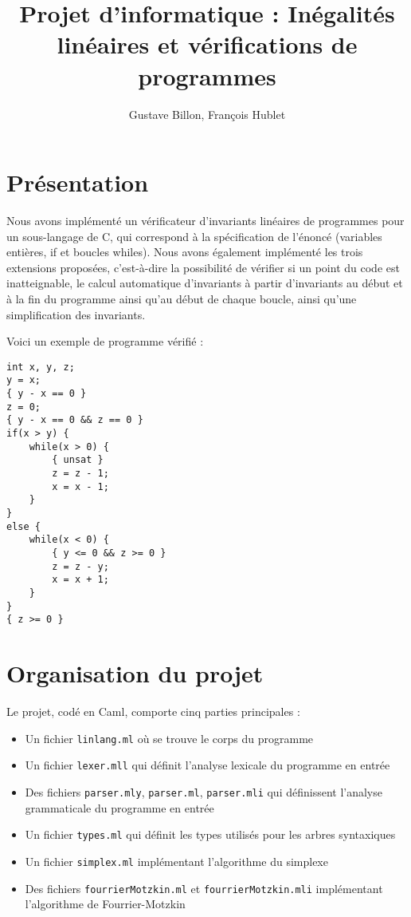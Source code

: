 \documentclass[a4paper]{article}
\title{Projet d'informatique : Inégalités linéaires et vérifications de programmes}
\author{Gustave Billon, François Hublet}
\begin{document}
\maketitle


\section{Présentation}

Nous avons implémenté un vérificateur d'invariants linéaires de programmes pour un sous-langage de C, qui correspond à la spécification de l'énoncé (variables entières, if et boucles whiles). Nous avons également implémenté les trois extensions proposées, c'est-à-dire la possibilité de vérifier si un point du code est inatteignable, le calcul automatique d'invariants à partir d'invariants au début et à la fin du programme ainsi qu'au début de chaque boucle, ainsi qu'une simplification des invariants.

Voici un exemple de programme vérifié :

\begin{lstlisting}
int x, y, z;
y = x;
{ y - x == 0 }
z = 0;
{ y - x == 0 && z == 0 }
if(x > y) {
	while(x > 0) {
		{ unsat }
		z = z - 1;
		x = x - 1;
	}
}
else {
	while(x < 0) {
		{ y <= 0 && z >= 0 }
		z = z - y;
		x = x + 1;
	}
}
{ z >= 0 }
\end{lstlisting}

\section{Organisation du projet}

Le projet, codé en Caml, comporte cinq parties principales :

\begin{itemize}
  \item Un fichier \texttt{linlang.ml} où se trouve le corps du programme
  \item Un fichier \texttt{lexer.mll} qui définit l'analyse lexicale du programme en entrée
  \item Des fichiers \texttt{parser.mly}, \texttt{parser.ml}, \texttt{parser.mli} qui définissent l'analyse grammaticale du programme en entrée
  \item Un fichier \texttt{types.ml} qui définit les types utilisés pour les arbres syntaxiques
  \item Un fichier \texttt{simplex.ml} implémentant l'algorithme du simplexe
  \item Des fichiers \texttt{fourrierMotzkin.ml} et \texttt{fourrierMotzkin.mli} implémentant l'algorithme de Fourrier-Motzkin

\end{itemize}
\end{document}
